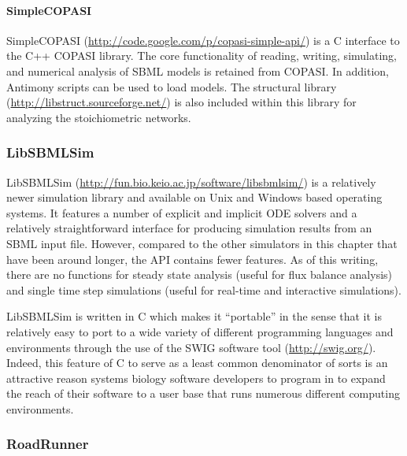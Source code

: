 \paragraph{SimpleCOPASI}

SimpleCOPASI (\url{http://code.google.com/p/copasi-simple-api/}) is a C
interface to the C++ COPASI library. The core functionality of reading,
writing, simulating, and numerical analysis of SBML models is retained
from COPASI. In addition, Antimony scripts can be used to load models.
The structural library (\url{http://libstruct.sourceforge.net/}) is also
included within this library for analyzing the stoichiometric networks.

\subsubsection{LibSBMLSim}

LibSBMLSim (\url{http://fun.bio.keio.ac.jp/software/libsbmlsim/}) is a
relatively newer simulation library and available on Unix and Windows
based operating systems. It features a number of explicit and implicit
ODE solvers and a relatively straightforward interface for producing
simulation results from an SBML input file. However, compared to the
other simulators in this chapter that have been around longer, the API
contains fewer features. As of this writing, there are no functions for
steady state analysis (useful for flux balance analysis) and single time
step simulations (useful for real-time and interactive simulations).

LibSBMLSim is written in C which makes it ``portable'' in the sense that
it is relatively easy to port to a wide variety of different programming
languages and environments through the use of the SWIG software tool
(\url{http://swig.org/}). Indeed, this feature of C to serve as a least
common denominator of sorts is an attractive reason systems biology
software developers to program in to expand the reach of their software
to a user base that runs numerous different computing environments.

\subsubsection{RoadRunner}

